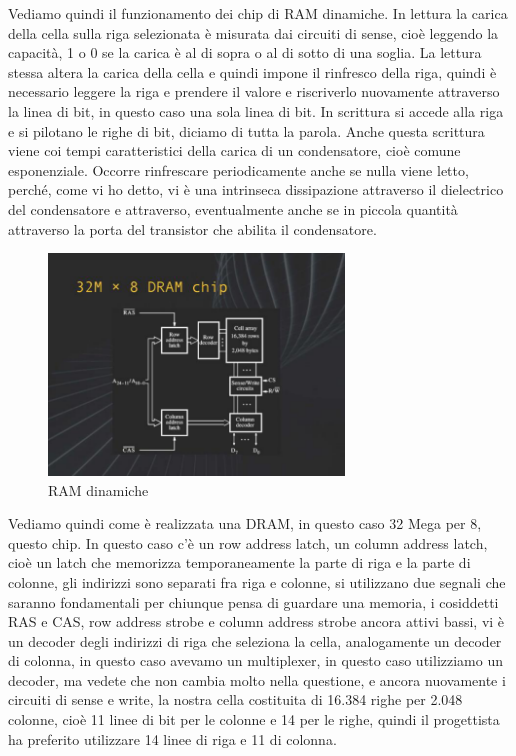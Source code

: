 Vediamo quindi il funzionamento dei chip di RAM dinamiche.
In lettura la carica della cella sulla riga selezionata è misurata dai circuiti di sense, cioè leggendo la capacità, 1 o 0 se la carica è al di sopra o al di sotto di una soglia.
La lettura stessa altera la carica della cella e quindi impone il rinfresco della riga, quindi è necessario leggere la riga e prendere il valore e riscriverlo nuovamente attraverso la linea di bit, in questo caso una sola linea di bit.
In scrittura si accede alla riga e si pilotano le righe di bit, diciamo di tutta la parola.
Anche questa scrittura viene coi tempi caratteristici della carica di un condensatore, cioè comune esponenziale.
Occorre rinfrescare periodicamente anche se nulla viene letto, perché, come vi ho detto, vi è una intrinseca dissipazione attraverso il dielectrico del condensatore e attraverso, eventualmente anche se in piccola quantità attraverso la porta del transistor che abilita il condensatore.

\FloatBarrier
\begin{figure}[H]
  \centering
  \includegraphics[width=0.70\textwidth,
                    trim=50 30 90 50, %
                    clip]
                    {images/Lez04_p04_fig_04.png}
  \caption{RAM dinamiche}
  \label{fig:Lez04_p04_fig_04}
\end{figure}
\FloatBarrier
\noindent

Vediamo quindi come è realizzata una DRAM, in questo caso 32 Mega per 8, questo chip.
In questo caso c'è un row address latch, un column address latch, cioè un latch che memorizza temporaneamente la parte di riga e la parte di colonne, gli indirizzi sono separati fra riga e colonne, si utilizzano due segnali che saranno fondamentali per chiunque pensa di guardare una memoria, i cosiddetti RAS e CAS, row address strobe e column address strobe ancora attivi bassi, vi è un decoder degli indirizzi di riga che seleziona la cella, analogamente un decoder di colonna, in questo caso avevamo un multiplexer, in questo caso utilizziamo un decoder, ma vedete che non cambia molto nella questione, e ancora nuovamente i circuiti di sense e write, la nostra cella costituita di 16.384 righe per 2.048 colonne, cioè 11 linee di bit per le colonne e 14 per le righe, quindi il progettista ha preferito utilizzare 14 linee di riga e 11 di colonna.

